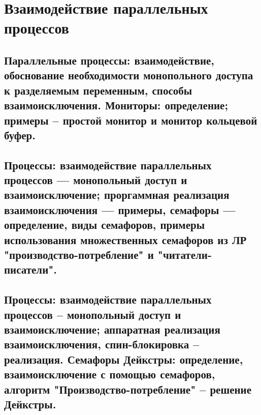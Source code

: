 \section{Взаимодействие параллельных процессов}

\subsection{Параллельные процессы: взаимодействие, обоснование необходимости монопольного доступа к разделяемым переменным, способы взаимоисключения. Мониторы: определение; примеры – простой монитор и монитор кольцевой буфер.}

\newpage

\subsection{Процессы: взаимодействие параллельных процессов --- монопольный доступ и взаимоисключение; проргаммная реализация взаимоисключения --- примеры, семафоры --- определение, виды семафоров, примеры использования множественных семафоров из ЛР "производство-потребление" и "читатели-писатели".} %

\newpage

\subsection{Процессы: взаимодействие параллельных процессов – монопольный доступ и взаимоисключение; аппаратная реализация взаимоисключения, спин-блокировка – реализация. Семафоры Дейкстры: определение, взаимоисключение с помощью семафоров, алгоритм "Производство-потребление" – решение Дейкстры.}
